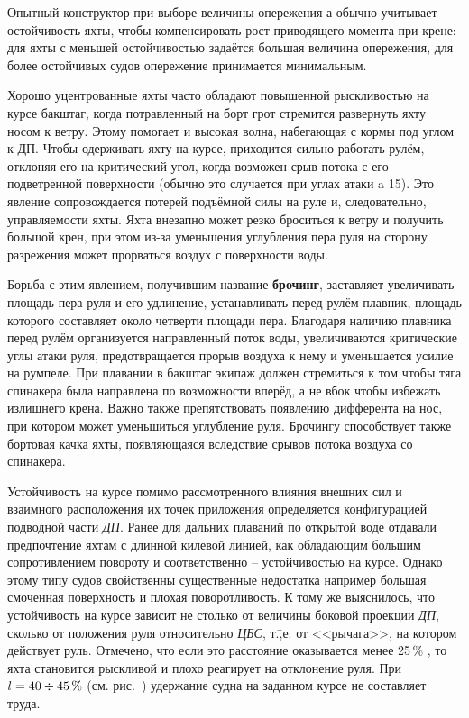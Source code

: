 Опытный конструктор при выборе величины опережения а обычно учитывает
остойчивость яхты, чтобы компенсировать рост приводящего момента при
крене: для яхты с меньшей остойчивостью задаётся большая величина
опережения, для более остойчивых судов опережение принимается
минимальным.

Хорошо уцентрованные яхты часто обладают повышенной рыскливостью на
курсе бакштаг, когда потравленный на борт грот стремится развернуть
яхту носом к ветру. Этому помогает и высокая волна, набегающая с кормы
под углом к ДП. Чтобы одерживать яхту на курсе, приходится сильно
работать рулём, отклоняя его на критический угол, когда возможен срыв
потока с его подветренной поверхности (обычно это случается при углах
атаки a 15\gr). Это явление сопровождается потерей подъёмной
силы на руле и, следовательно, управляемости яхты. Яхта внезапно может
резко броситься к ветру и получить большой крен, при этом из-за
уменьшения углубления пера руля на сторону разрежения может прорваться
воздух с поверхности воды.

Борьба с этим явлением, получившим название
\textbf{брочинг}, заставляет увеличивать площадь пера
руля и его удлинение, устанавливать перед рулём плавник, площадь
которого составляет около четверти площади пера. Благодаря наличию
плавника перед рулём организуется направленный поток воды,
увеличиваются критические углы атаки руля, предотвращается прорыв
воздуха к нему и уменьшается усилие на румпеле. При плавании в бакштаг
экипаж должен стремиться к том чтобы тяга спинакера была направлена по
возможности вперёд, а не вбок чтобы избежать излишнего крена. Важно
также препятствовать появлению дифферента на нос, при котором может
уменьшиться углубление руля. Брочингу способствует также бортовая
качка яхты, появляющаяся вследствие срывов потока воздуха со
спинакера.

Устойчивость на курсе помимо рассмотренного влияния внешних сил и
взаимного расположения их точек приложения определяется конфигурацией
подводной части \textit{ДП}. Ранее для дальних плаваний по открытой
воде отдавали предпочтение яхтам с длинной килевой линией, как
обладающим большим сопротивлением повороту и соответственно \---
устойчивостью на курсе. Однако этому типу судов свойственны
существенные недостатка например большая смоченная поверхность и
плохая поворотливость. К тому же выяснилось, что устойчивость на курсе
зависит не столько от величины боковой проекции \textit{ДП}, сколько
от положения руля относительно \textit{ЦБС}, т.\=,е. от <<рычага>>, на
котором действует руль. Отмечено, что если это расстояние оказывается
менее 25\,\% \lkvl, то яхта становится рыскливой и плохо реагирует на
отклонение руля. При $l = 40 \div 45\,\%$ \lkvl (см. рис.~)
удержание судна на заданном курсе не составляет труда.

